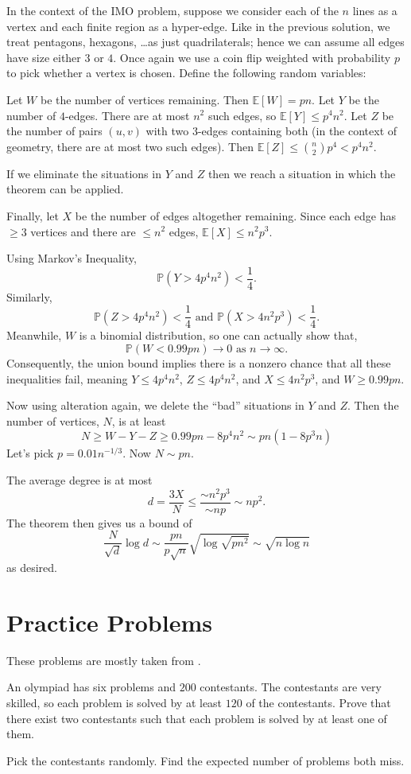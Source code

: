 \documentclass[11pt]{scrartcl}
\newcommand\EE{\mathbb E}
\newcommand\PP{\mathbb P}
\begin{document}
In the context of the IMO problem, suppose we consider each of the $n$ lines as a vertex
and each finite region as a hyper-edge.
Like in the previous solution, we treat pentagons, hexagons, \dots as just quadrilaterals;
hence we can assume all edges have size either $3$ or $4$.
Once again we use a coin flip weighted with probability $p$ to pick whether a vertex is chosen.
Define the following random variables:
\begin{itemize}
  \ii Let $W$ be the number of vertices remaining. Then $\EE[W] = pn$.
  \ii Let $Y$ be the number of $4$-edges. There are at most $n^2$ such edges, so $\EE[Y] \le p^4n^2$.
  \ii Let $Z$ be the number of pairs $(u,v)$ with two $3$-edges containing both (in the context of geometry, there are at most two such edges).
  Then $\EE[Z] \le \binom n2 p^4 < p^4n^2$.
\end{itemize}
If we eliminate the situations in $Y$ and $Z$ then we reach a situation in which the theorem can be applied.

Finally, let $X$ be the number of edges altogether remaining.
Since each edge has $\ge 3$ vertices and there are $\le n^2$ edges, $\EE[X] \le n^2p^3$.

Using Markov's Inequality, \[ \PP(Y > 4p^4n^2) < \frac 14.
\] Similarly, \[ \PP(Z > 4p^4n^2) < \frac 14 \text{ and } \PP(X > 4n^2p^3) < \frac 14. \]
Meanwhile, $W$ is a binomial distribution, so one can actually show that,
\[ \PP(W < 0.99pn) \to 0 \text{ as } n \to \infty. \]
Consequently, the union bound implies there is a nonzero chance that all these inequalities fail,
meaning $Y \le 4p^4n^2$, $Z \le 4p^4n^2$, and $X \le 4n^2p^3$, and $W \ge 0.99pn$.

Now using alteration again, we delete the ``bad'' situations in $Y$ and $Z$.
Then the number of vertices, $N$, is at least
\[ N \ge W - Y - Z \ge 0.99 pn - 8p^4n^2 \sim pn(1-8p^3n) \]
Let's pick $p = 0.01n^{-1/3}$.  Now $N \sim pn$.

The average degree is at most \[ d = \frac{3X}{N} \le \frac{\sim n^2p^3}{\sim np} \sim np^2. \]
The theorem then gives us a bound of
\[ \frac{N}{\sqrt{d}} \log d \sim \frac{pn}{p\sqrt n} \sqrt{\log \sqrt{pn^2}} \sim \sqrt{n \log n} \]
as desired.


\section{Practice Problems}
These problems are mostly taken from \cite{ravi,poshen}.

\begin{problem}
  [IMC 2002] An olympiad has six problems and $200$ contestants.  The contestants are very skilled,
  so each problem is solved by at least $120$ of the contestants.
  Prove that there exist two contestants such that each problem is solved by at least one of them.
  \begin{sketch}
    Pick the contestants randomly. Find the expected number of problems both miss.
  \end{sketch}
\end{problem}
\end{document}

